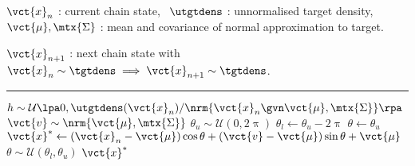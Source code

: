\begin{algorithmic}
\small
    \Require
    $\vct{x}_n$ : current chain state,~
    $\utgtdens$ : unnormalised target density,\\
    $\vct{\mu},\mtx{\Sigma}$ : mean and covariance of normal approximation to target.
    \Ensure\raggedright
    $\vct{x}_{n+1}$ : next chain state with $\vct{x}_n \sim \tgtdens \implies \vct{x}_{n+1} \sim \tgtdens$.
\end{algorithmic}
\hrule
\small
\begin{algorithmic}[1]
  \State $h \sim \mathcal{U}\lpa 0,\utgtdens(\vct{x}_n) / \nrm{\vct{x}_n \gvn \vct{\mu}, \mtx{\Sigma}}\rpa$ 
  \State $\vct{v} \sim \nrm{\vct{\mu}, \mtx{\Sigma}}$ 
  \State $\theta_u \sim \mathcal{U}(0,2\uppi)$ 
  \State $\theta_l \gets \theta_u - 2\uppi$
  \State $\theta \gets \theta_u$
    \State $\vct{x}^* \gets (\vct{x}_n - \vct{\mu}) \cos\theta + (\vct{v} - \vct{\mu}) \sin\theta + \vct{\mu}$  
     
       
      \State $\theta \sim \mathcal{U}(\theta_l, \theta_u)$ 
    \Else
      \State \Return $\vct{x}^*$
    \EndIf
  \EndWhile
\end{algorithmic}
